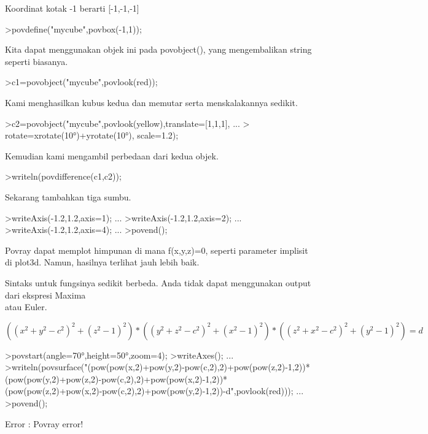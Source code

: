 \documentclass[a4paper,10pt]{article}
\begin{document}
\begin{eulernotebook}
\begin{eulercomment}
\begin{eulercomment}
\begin{eulercomment}
Koordinat kotak -1 berarti [-1,-1,-1]
\end{eulercomment}
\begin{eulerprompt}
>povdefine("mycube",povbox(-1,1));
\end{eulerprompt}
\begin{eulercomment}
Kita dapat menggunakan objek ini pada povobject(), yang mengembalikan
string seperti biasanya.
\end{eulercomment}
\begin{eulerprompt}
>c1=povobject("mycube",povlook(red));
\end{eulerprompt}
\begin{eulercomment}
Kami menghasilkan kubus kedua dan memutar serta menskalakannya
sedikit.
\end{eulercomment}
\begin{eulerprompt}
>c2=povobject("mycube",povlook(yellow),translate=[1,1,1], ...
>  rotate=xrotate(10°)+yrotate(10°), scale=1.2);
\end{eulerprompt}
\begin{eulercomment}
Kemudian kami mengambil perbedaan dari kedua objek.
\end{eulercomment}
\begin{eulerprompt}
>writeln(povdifference(c1,c2));
\end{eulerprompt}
\begin{eulercomment}
Sekarang tambahkan tiga sumbu.
\end{eulercomment}
\begin{eulerprompt}
>writeAxis(-1.2,1.2,axis=1); ...
>writeAxis(-1.2,1.2,axis=2); ...
>writeAxis(-1.2,1.2,axis=4); ...
>povend();
\end{eulerprompt}
\begin{eulercomment}
Povray dapat memplot himpunan di mana f(x,y,z)=0, seperti parameter
implisit di plot3d. Namun, hasilnya terlihat jauh lebih baik.

Sintaks untuk fungsinya sedikit berbeda. Anda tidak dapat menggunakan
output dari ekspresi Maxima\\
atau Euler.

\end{eulercomment}
\begin{eulerformula}
\[
((x^2+y^2-c^2)^2+(z^2-1)^2)*((y^2+z^2-c^2)^2+(x^2-1)^2)*((z^2+x^2-c^2)^2+(y^2-1)^2)=d
\]
\end{eulerformula}
\begin{eulerprompt}
>povstart(angle=70°,height=50°,zoom=4);
>writeAxes(); ...
>writeln(povsurface("(pow(pow(x,2)+pow(y,2)-pow(c,2),2)+pow(pow(z,2)-1,2))*(pow(pow(y,2)+pow(z,2)-pow(c,2),2)+pow(pow(x,2)-1,2))*(pow(pow(z,2)+pow(x,2)-pow(c,2),2)+pow(pow(y,2)-1,2))-d",povlook(red))); ...
>povend();
\end{eulerprompt}
\begin{euleroutput}
  Error : Povray error!
  

\end{euleroutput}
\end{eulercomment}
\end{eulercomment}
\end{eulernotebook}
\end{document}
